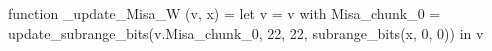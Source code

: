function _update_Misa_W (v, x) = let v = { v with Misa_chunk_0 = update_subrange_bits(v.Misa_chunk_0, 22, 22, subrange_bits(x, 0, 0)) } in
  v
